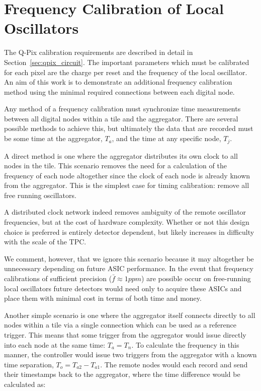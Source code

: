 \section{Frequency Calibration of Local Oscillators}\label{sec:calib}
The Q-Pix calibration requirements are described in detail in Section~\ref{sec:qpix_circuit}.
The important parameters which must be calibrated for each pixel are the charge per reset and the frequency of the local oscillator.
An aim of this work is to demonstrate an additional frequency calibration method using the minimal required connections between each digital node.

Any method of a frequency calibration must synchronize time measurements between all digital nodes within a tile and the aggregator.
There are several possible methods to achieve this, but ultimately the data that are recorded must be some time at the aggregator, $T_{a}$, and the time at any specific node, $T_{j}$.

A direct method is one where the aggregator distributes its own clock to all nodes in the tile.
This scenario removes the need for a calculation of the frequency of each node altogether since the clock of each node is already known from the aggregator.
This is the simplest case for timing calibration: remove all free running oscillators.

A distributed clock network indeed removes ambiguity of the remote oscillator frequencies, but at the cost of hardware complexity.
Whether or not this design choice is preferred is entirely detector dependent, but likely increases in difficulty with the scale of the TPC.

We comment, however, that we ignore this scenario because it may altogether be unnecessary depending on future ASIC performance.
In the event that frequency calibrations of sufficient precision ($\bar{f} \approx 1 ppm$) are possible occur on free-running local oscillators future detectors would need only to acquire these ASICs and place them with minimal cost in terms of both time and money.

Another simple scenario is one where the aggregator itself connects directly to all nodes within a tile via a single connection which can be used as a reference trigger.
This means that some trigger from the aggregator would issue directly into each node at the same time: $T_{a} = T_{n}$.
To calculate the frequency in this manner, the controller would issue two triggers from the aggregator with a known time separation, $T_{o} = T_{a2} - T_{a1}$.
The remote nodes would each record and send their timestamps back to the aggregator, where the time difference would be calculated as:

